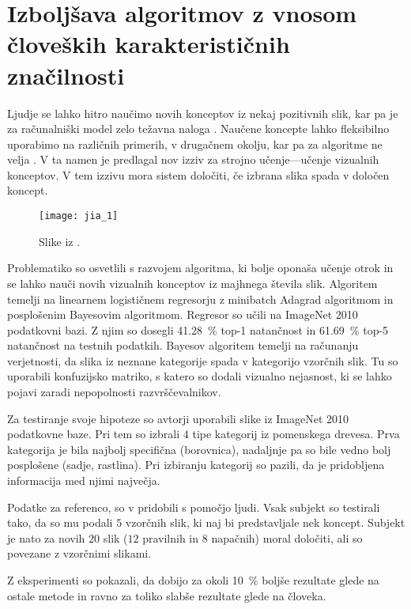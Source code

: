 \section{Izboljšava algoritmov z vnosom človeških karakterističnih značilnosti}
Ljudje se lahko hitro naučimo novih konceptov iz nekaj pozitivnih slik, kar pa je za računalniški model zelo težavna naloga \cite{jia2013visual}. Naučene koncepte lahko fleksibilno uporabimo na različnih primerih, v drugačnem okolju, kar pa za algoritme ne velja \cite{lake2015human}. V ta namen je  predlagal nov izziv za strojno učenje---učenje vizualnih konceptov. V tem izzivu mora sistem določiti, če izbrana slika spada v določen koncept. 

\begin{figure}[!htbp]
	\centering
	\texttt{[image: jia\_1]}
	\caption{Slike iz \cite{deng2009imagenet}.}
\end{figure}

Problematiko so osvetlili s razvojem algoritma, ki bolje oponaša učenje otrok in se lahko nauči novih vizualnih konceptov iz majhnega števila slik. Algoritem temelji na linearnem logističnem regresorju z minibatch Adagrad algoritmom in posplošenim Bayesovim algoritmom. Regresor so učili na ImageNet 2010 podatkovni bazi. Z njim so dosegli \SI{41.28}{\%} top-1 natančnost in \SI{61.69}{\%} top-5 natančnost na testnih podatkih. Bayesov algoritem temelji na računanju verjetnosti, da slika iz neznane kategorije spada v kategorijo vzorčnih slik. Tu so uporabili konfuzijsko matriko, s katero so dodali vizualno nejasnost, ki se lahko pojavi zaradi nepopolnosti razvrščevalnikov.

Za testiranje svoje hipoteze so avtorji uporabili slike iz ImageNet 2010 podatkovne baze. Pri tem so izbrali $4$ tipe kategorij iz pomenskega drevesa. Prva kategorija je bila najbolj specifična (borovnica), nadaljnje pa so bile vedno bolj posplošene (sadje, rastlina). Pri izbiranju kategorij so pazili, da je pridobljena informacija med njimi največja. 

Podatke za referenco, so v \cite{jia2013visual} pridobili s pomočjo ljudi. Vsak subjekt so testirali tako, da so mu podali $5$ vzorčnih slik, ki naj bi predstavljale nek koncept. Subjekt je nato za novih $20$ slik ($12$ pravilnih in $8$ napačnih) moral določiti, ali so povezane z vzorčnimi slikami.

Z eksperimenti so pokazali, da dobijo za okoli \SI{10}{\%} boljše rezultate glede na ostale metode in ravno za toliko slabše rezultate glede na človeka. 



